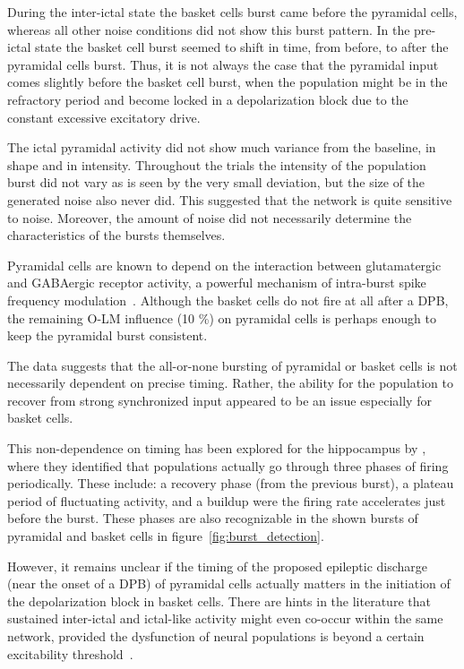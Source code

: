During the inter-ictal state the basket cells burst came before the pyramidal cells, whereas all other noise conditions did not show this burst pattern.
In the pre-ictal state the basket cell burst seemed to shift in time, from before, to after the pyramidal cells burst.
Thus, it is not always the case that the pyramidal input comes slightly before the basket cell burst, when the population might be in the refractory period and become locked in a depolarization block
due to the constant excessive excitatory drive.

The ictal pyramidal activity did not show much variance from the baseline, in shape and in intensity.
Throughout the trials the intensity of the population burst did not vary as is seen by the very small deviation, but the size of the generated noise also never did.
This suggested that the network is quite sensitive to noise. Moreover, the amount of noise did not necessarily determine the characteristics of the bursts themselves.

Pyramidal cells are known to depend on the interaction between glutamatergic and GABAergic receptor activity, a powerful mechanism
of intra-burst spike frequency modulation~\parencite{dzhalaExcitatoryActionsEndogenously2003}. Although the basket cells do not fire at all after a DPB, the remaining O-LM influence (10 \%)
on pyramidal cells is perhaps enough to keep the pyramidal burst consistent.

The data suggests that the all-or-none bursting of pyramidal or basket cells is not necessarily dependent on precise timing.
Rather, the ability for the population to recover from strong synchronized input appeared to be an issue especially for basket cells.

This non-dependence on timing has been explored for the hippocampus by \textcite{menendezdelapridaThresholdBehaviorInitiation2006}, where
they identified that populations actually go through three phases of firing periodically. These include: a recovery phase (from the previous burst), a plateau period of fluctuating activity,
and a buildup were the firing rate accelerates just before the burst. These phases are also recognizable in the shown bursts of pyramidal and basket cells in figure~\ref{fig:burst_detection}.

However, it remains unclear if the timing of the proposed epileptic discharge (near the onset of a DPB) of pyramidal cells actually matters in the initiation of the depolarization block in basket cells.
There are hints in the literature that sustained inter-ictal and ictal-like activity might even co-occur within the same network, provided the dysfunction of neural populations
is beyond a certain excitability threshold~\parencite{dzhalaTransitionInterictalIctal2003}.


